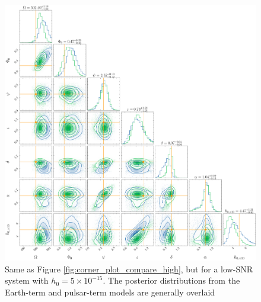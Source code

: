 \documentclass[fleqn,usenatbib,useAMS]{mnras}
\begin{document}
\begin{figure}
	\includegraphics[width=\textwidth, height =\textwidth ]{images/corner_lowSNR}
	\caption{Same as Figure \ref{fig:corner_plot_compare_high}, but for a low-SNR system with $h_0 = 5 \times 10^{-15}$. The posterior distributions from the Earth-term and pulsar-term models are generally overlaid }
	\label{fig:corner_plot_compare_low}
\end{figure}
\end{document}
